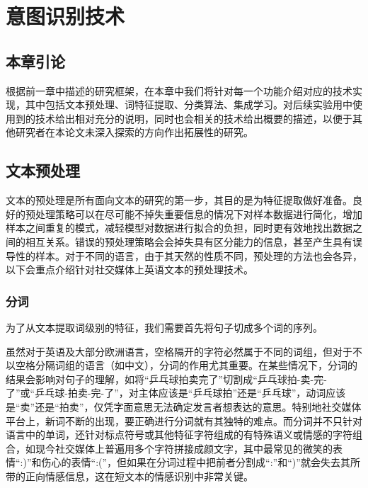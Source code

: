 \chapter{意图识别技术}
\label{cha:tech}

\section{本章引论}

根据前一章中描述的研究框架，在本章中我们将针对每一个功能介绍对应的技术实现，其中包括文本预处理、词特征提取、分类算法、集成学习。对后续实验用中使用到的技术给出相对充分的说明，同时也会相关的技术给出概要的描述，以便于其他研究者在本论文未深入探索的方向作出拓展性的研究。

\section{文本预处理}

文本的预处理是所有面向文本的研究的第一步，其目的是为特征提取做好准备。良好的预处理策略可以在尽可能不掉失重要信息的情况下对样本数据进行简化，增加样本之间重复的模式，减轻模型对数据进行拟合的负担，同时更有效地找出数据之间的相互关系。错误的预处理策略会会掉失具有区分能力的信息，甚至产生具有误导性的样本。对于不同的语言，由于其天然的性质不同，预处理的方法也会各异，以下会重点介绍针对社交媒体上英语文本的预处理技术。

\subsection{分词}

为了从文本提取词级别的特征，我们需要首先将句子切成多个词的序列。

虽然对于英语及大部分欧洲语言，空格隔开的字符必然属于不同的词组，但对于不以空格分隔词组的语言（如中文），分词的作用尤其重要。在某些情况下，分词的结果会影响对句子的理解，如将“乒乓球拍卖完了”切割成“乒乓球拍-卖-完-了”或“乒乓球-拍卖-完-了”，对主体应该是“乒乓球拍”还是“乒乓球”，动词应该是“卖”还是“拍卖”，仅凭字面意思无法确定发言者想表达的意思。特别地社交媒体平台上，新词不断的出现，要正确进行分词就有其独特的难点。而分词并不只针对语言中的单词，还针对标点符号或其他特征字符组成的有特殊语义或情感的字符组合，如现今社交媒体上普遍用多个字符拼接成颜文字，其中最常见的微笑的表情“:)”和伤心的表情“:(”，但如果在分词过程中把前者分割成“:”和“)”就会失去其所带的正向情感信息，这在短文本的情感识别中非常关键。

